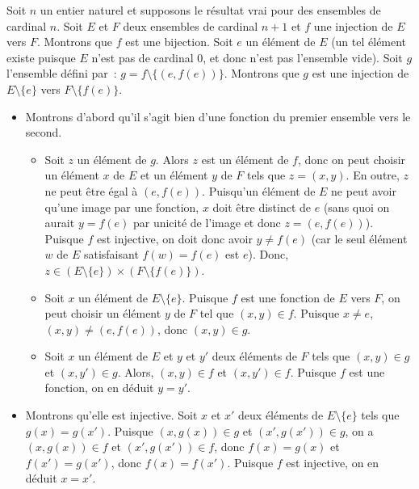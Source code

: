     Soit $n$ un entier naturel et supposons le résultat vrai pour des ensembles de cardinal $n$. 
    Soit $E$ et $F$ deux ensembles de cardinal $n+1$ et $f$ une injection de $E$ vers $F$. 
    Montrons que $f$ est une bijection.
    Soit $e$ un élément de $E$ (un tel élément existe puisque $E$ n'est pas de cardinal $0$, et donc n'est pas l'ensemble vide). 
    Soit $g$ l'ensemble défini par : $g = f \setminus \lbrace (e, f(e)) \rbrace$. 
    Montrons que $g$ est une injection de $E \setminus \lbrace e \rbrace$ vers $F \setminus \lbrace f(e) \rbrace$. 
    \begin{itemize}[nosep]
        \item Montrons d'abord qu'il s'agit bien d'une fonction du premier ensemble vers le second. 
            \begin{itemize}[nosep]
                \item Soit $z$ un élément de $g$. 
                    Alors $z$ est un élément de $f$, donc on peut choisir un élément $x$ de $E$ et un élément $y$ de $F$ tels que $z = (x,y)$.
                    En outre, $z$ ne peut être égal à $(e,f(e))$. 
                    Puisqu'un élément de $E$ ne peut avoir qu'une image par une fonction, $x$ doit être distinct de $e$ (sans quoi on aurait $y = f(e)$ par unicité de l'image et donc $z = (e,f(e))$).
                    Puisque $f$ est injective, on doit donc avoir $y \neq f(e)$ (car le seul élément $w$ de $E$ satisfaisant $f(w) = f(e)$ est $e$).
                    Donc, $z \in (E \setminus \lbrace e \rbrace) \times (F \setminus \lbrace f(e) \rbrace)$.
                \item Soit $x$ un élément de $E \setminus \lbrace e \rbrace$. 
                    Puisque $f$ est une fonction de $E$ vers $F$, on peut choisir un élément $y$ de $F$ tel que $(x,y) \in f$. 
                    Puisque $x \neq e$, $(x,y) \neq (e,f(e))$, donc $(x,y) \in g$.
                \item Soit $x$ un élément de $E$ et $y$ et $y'$ deux éléments de $F$ tels que $(x,y) \in g$ et $(x,y') \in g$.
                    Alors, $(x,y) \in f$ et $(x,y') \in f$.
                    Puisque $f$ est une fonction, on en déduit $y = y'$.
            \end{itemize}
        \item Montrons qu'elle est injective. 
            Soit $x$ et $x'$ deux éléments de $E \setminus \lbrace e \rbrace$ tels que $g(x) = g(x')$. 
            Puisque $(x,g(x)) \in g$ et $(x',g(x')) \in g$, on a $(x,g(x)) \in f$ et $(x',g(x')) \in f$, donc $f(x) = g(x)$ et $f(x') = g(x')$, donc $f(x) = f(x')$. 
            Puisque $f$ est injective, on en déduit $x = x'$.
    \end{itemize}

